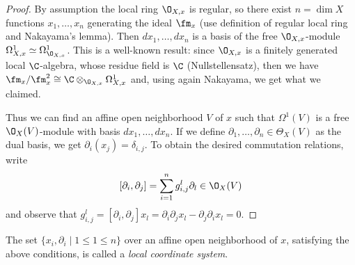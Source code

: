 \documentclass[a4paper, 10pt]{article}
\begin{document}
        \begin{proof}
            By assumption the local ring $\O_{X, x}$ is regular, so there exist $n = \dim X$ functions $x_1, \dots, x_n$ generating the ideal $\fm_x$ (use definition of regular local ring and Nakayama's lemma). Then $dx_1, \dots, dx_n$ is a basis of the free $\O_{X,x}$-module $\Omega^1_{X, x} \simeq \Omega^1_{\O_{X, x}}$. This is a well-known result: since $\O_{X, x}$ is a finitely generated local $\C$-algebra, whose residue field is $\C$ (Nullstellensatz), then we have $\fm_x/\fm_x^2 \cong \C \otimes_{\O_{X, x}} \Omega^1_{X, x}$ and, using again Nakayama, we get what we claimed.

            Thus we can find an affine open neighborhood $V$ of $x$ such that $\Omega^1(V)$ is a free $\O_X(V)$-module with basis $dx_1, \dots, dx_n$. If we define $\partial_1, \dots, \partial_n \in \Theta_X(V)$ as the dual basis, we get $\partial_i(x_j) = \delta_{i, j}$. To obtain the desired commutation relations, write \[[\partial_i, \partial_j] = \sum_{i=1}^n g_{i,j}^l\partial_l \in \O_X(V) \] and observe that $g_{i,j}^l = [\partial_i, \partial_j]x_l = \partial_i\partial_j x_l - \partial_j\partial_i x_l = 0$.
        \end{proof}
        The set $\{x_i, \partial_i \mid 1 \leq 1 \leq n\}$ over an affine open neighborhood of $x$, satisfying the above conditions, is called a \emph{local coordinate system}.
        
\end{document}
